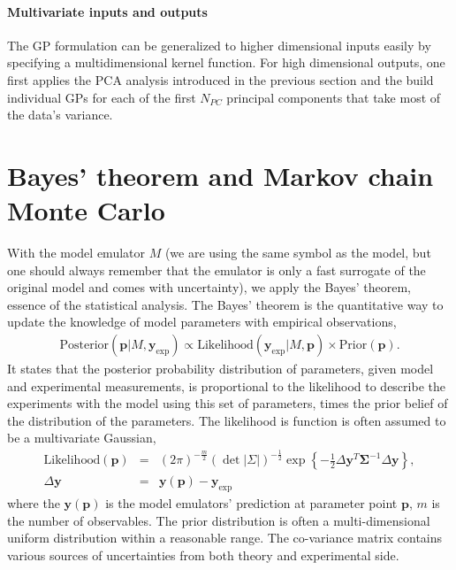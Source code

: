 \paragraph{Multivariate inputs and outputs} The GP formulation can be generalized to higher dimensional inputs easily by specifying a multidimensional kernel function.
For high dimensional outputs, one first applies the PCA analysis introduced in the previous section and the build individual GPs for each of the first $N_{PC}$ principal components that take most of the data's variance.

\section{Bayes' theorem and Markov chain Monte Carlo}
With the model emulator $M$ (we are using the same symbol as the model, but one should always remember that the emulator is only a fast surrogate of the original model and comes with uncertainty), we apply the Bayes' theorem, essence of the statistical analysis.
The Bayes' theorem is the quantitative way to update the knowledge of model parameters with empirical observations,
\begin{eqnarray}
\mathrm{Posterior}(\mathbf{p}|M, \mathbf{y}_{\textrm{exp}}) \propto \mathrm{Likelihood}(\mathbf{y}_{\textrm{exp}}|M, \mathbf{p})\times\mathrm{Prior}(\mathbf{p}).
\end{eqnarray}
It states that the posterior probability distribution of parameters, given model and experimental measurements, is proportional to the likelihood to describe the experiments with the model using this set of parameters, times the prior belief of the distribution of the parameters.
The likelihood is function is often assumed to be a multivariate Gaussian,
\begin{eqnarray}
\mathrm{Likelihood}(\mathbf{p}) &=& (2\pi)^{-\frac{m}{2}} (\det|\Sigma|)^{-\frac{1}{2}} \exp\left\{-\frac{1}{2}\Delta \mathbf{y}^T \mathbf{\Sigma}^{-1} \Delta \mathbf{y}\right\}, \\ 
\Delta \mathbf{y} &=& \mathbf{y}(\mathbf{p}) - \mathbf{y}_{\textrm{exp}}
\end{eqnarray}
where the $\mathbf{y}(\mathbf{p})$ is the model emulators' prediction at parameter point $\mathbf{p}$, $m$ is the number of observables.
The prior distribution is often a multi-dimensional uniform distribution within a reasonable range. 
The co-variance matrix contains various sources of uncertainties from both theory and experimental side.

